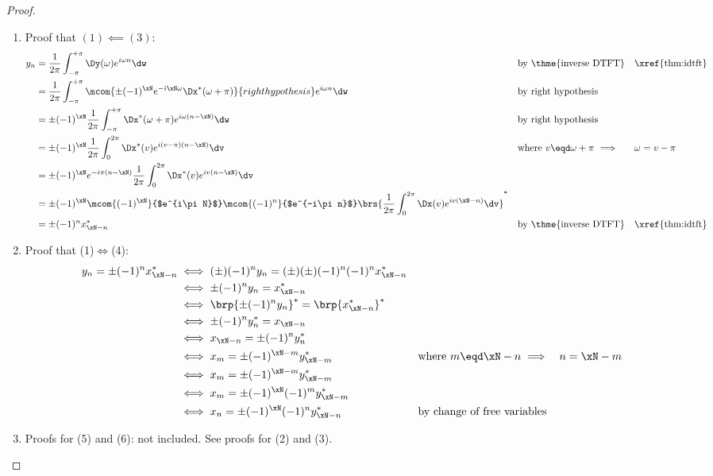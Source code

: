 \begin{proof}
\begin{enumerate}
  \item Proof that $(1)\impliedby(3)$:
    \begin{align*}
      y_n
        &= \frac{1}{2\pi}\int_{-\pi}^{+\pi} \Dy(\omega) e^{i\omega n} \dw
        && \text{by \thme{inverse DTFT}}
        && \text{\xref{thm:idtft}}
      \\&= \frac{1}{2\pi}\int_{-\pi}^{+\pi} \mcom{\pm (-1)^\xN e^{-i\xN\omega} \Dx^\ast(\omega+\pi)}{right hypothesis} e^{i\omega n} \dw
        && \text{by right hypothesis}
      \\&= \pm (-1)^\xN\frac{1}{2\pi}\int_{-\pi}^{+\pi}  \Dx^\ast(\omega+\pi) e^{i\omega(n-\xN)} \dw
        && \text{by right hypothesis}
      \\&= \pm (-1)^\xN\frac{1}{2\pi}\int_{0}^{2\pi}  \Dx^\ast(v) e^{i(v-\pi)(n-\xN)} \dv
        && \text{where $v\eqd\omega+\pi$ $\implies$}
        && \text{$\omega=v-\pi$}
      \\&= \pm (-1)^\xN e^{-i\pi(n-\xN)} \frac{1}{2\pi}\int_{0}^{2\pi}  \Dx^\ast(v) e^{iv(n-\xN)} \dv
      \\&= \pm (-1)^\xN \mcom{(-1)^\xN}{$e^{i\pi N}$} \mcom{(-1)^n}{$e^{-i\pi n}$} 
           \brs{\frac{1}{2\pi}\int_{0}^{2\pi}  \Dx(v) e^{iv(\xN-n)} \dv}^\ast
      \\&= \pm (-1)^n x_{\xN-n}^\ast
        && \text{by \thme{inverse DTFT}}
        && \text{\xref{thm:idtft}}
    \end{align*}

  \item Proof that (1)$\iff$(4): %
    \begin{align*}
      y_{n} = \pm (-1)^n x^\ast_{\xN-n}
        &\iff (\pm)(-1)^n y_{n} = (\pm)(\pm) (-1)^n (-1)^n x^\ast_{\xN-n}
      \\&\iff \pm(-1)^n y_{n} = x^\ast_{\xN-n}
      \\&\iff \brp{\pm(-1)^n y_{n}}^\ast = \brp{x^\ast_{\xN-n}}^\ast
      \\&\iff \pm(-1)^n y^\ast_{n} = x_{\xN-n}
      \\&\iff x_{\xN-n} = \pm(-1)^n y^\ast_{n}
      \\&\iff x_m = \pm(-1)^{\xN-m} y^\ast_{\xN-m}
        && \text{where $m\eqd \xN-n\implies$}
        && \text{$n=\xN-m$}
      \\&\iff x_m = \pm(-1)^{\xN-m} y^\ast_{\xN-m}
      \\&\iff x_m = \pm(-1)^\xN (-1)^m y^\ast_{\xN-m}
      \\&\iff x_n = \pm(-1)^\xN (-1)^n y^\ast_{\xN-n}
        &&    \text{by change of free variables}
    \end{align*} 

  \item Proofs for (5) and (6): not included. See proofs for (2) and (3).
\end{enumerate}
\end{proof}


